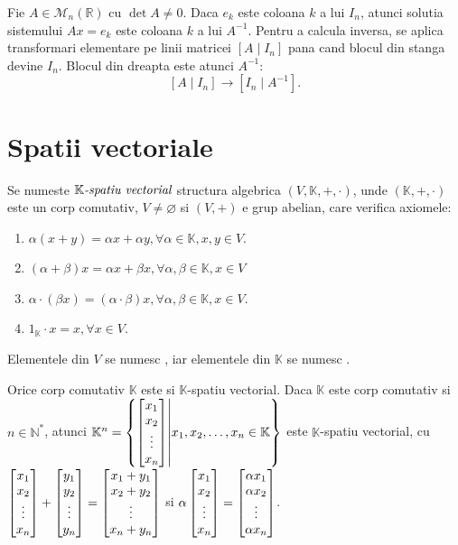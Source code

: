 \documentclass{article}
\begin{document}
\begin{enumerate}
\begin{tcolorbox}
    Fie $A \in \mathcal{M}_n(\mathbb{R})$ cu $\det A \neq 0$. Daca $e_k$ este coloana $k$ a lui $I_n$, atunci solutia sistemului $Ax = e_k$ este coloana $k$ a lui $A^{-1}$. Pentru a calcula inversa, se aplica transformari elementare pe linii matricei $[A \mid I_n]$ pana cand blocul din stanga devine $I_n$. Blocul din dreapta este atunci $A^{-1}$:
    \[
      [A \mid I_n] \longrightarrow [I_n \mid A^{-1}].
    \]
  \end{tcolorbox}

\end{enumerate}

\section{Spatii vectoriale}
\begin{enumerate}

   Se numeste $\mathbb{K}{\textit{-spatiu vectorial}}$ structura algebrica ${(V, \mathbb{K}, +, \cdot)}$, unde $(\mathbb{K}, +, \cdot)$ este un corp comutativ, $V \neq \varnothing$ si $(V, +)$ e grup abelian, care verifica axiomele:
  \begin{enumerate}
    \item $\alpha (x + y) = \alpha x + \alpha y, \forall \alpha \in \mathbb{K}, x, y \in V$. 
    \item $(\alpha + \beta)x = \alpha x + \beta x, \forall \alpha, \beta \in \mathbb{K}, x \in V$
    \item $\alpha \cdot (\beta x) = (\alpha \cdot \beta) x, \forall \alpha, \beta \in \mathbb{K}, x \in V$.
    \item $1_{\mathbb{K}} \cdot x = x, \forall x \in V$.

  \end{enumerate}
  Elementele din $V$ se numesc , iar elementele din $\mathbb{K}$ se numesc .
  
  \exemplu Orice corp comutativ $\mathbb{K}$ este si $\mathbb{K}$-spatiu vectorial.
  \exemplu Daca $\mathbb{K}$ este corp comutativ si $n \in \mathbb{N}^*$, atunci $\mathbb{K}^n = \left\{ \begin{bmatrix}x_1 \\ x_2 \\ \vdots \\ x_n\end{bmatrix} \middle\vert x_1, x_2, \dots, x_n \in \mathbb{K} \right\}$ este $\mathbb{K}$-spatiu vectorial, cu $\begin{bmatrix}x_1 \\ x_2 \\ \vdots \\ x_n\end{bmatrix} + \begin{bmatrix}y_1 \\ y_2 \\ \vdots \\ y_n\end{bmatrix} = \begin{bmatrix}x_1 + y_1 \\ x_2 + y_2 \\ \vdots \\ x_n + y_n\end{bmatrix}$ si $\alpha \begin{bmatrix}x_1 \\ x_2 \\ \vdots \\ x_n\end{bmatrix} = \begin{bmatrix}\alpha x_1 \\ \alpha x_2 \\ \vdots \\ \alpha x_n\end{bmatrix}$.
  

\end{enumerate}
\end{document}
